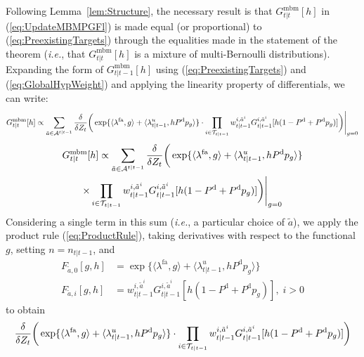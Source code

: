\documentclass[journal,twoside]{IEEEtran}
\theoremstyle{plain}
\begin{document}
\begin{IEEEproof}
Following Lemma~\ref{lem:Structure}, the necessary result is that  $G^\mathrm{mbm}_{t|t}[h]$ in (\ref{eq:UpdateMBMPGFl}) is made equal (or proportional) to (\ref{eq:PreexistingTargets}) through the equalities made in the statement of the theorem (\textit{i.e.}\xspace, that $G^\mathrm{mbm}_{t|t}[h]$ is a mixture of multi-Bernoulli distributions). Expanding the form of $G^\mathrm{mbm}_{t|t-1}[h]$ using (\ref{eq:PreexistingTargets}) and (\ref{eq:GlobalHypWeight}) and applying the linearity property of differentials, we can write:
%
\ifCLASSOPTIONdraftcls
\begin{equation}\label{eq:MBMUpdate1}
G^\mathrm{mbm}_{t|t}[h] \propto
\sum_{\tilde{a}\in{\cal A}^{t|t-1}} \frac{\delta}{\delta Z_t}\bigg( 
\exp\{\langle\lambda^\mathrm{fa},g\rangle + \langle\lambda^u_{t|t-1},h P^{\mathrm{d}} p_g\rangle\} 
\cdot \prod_{i\in{\cal T}_{t|t-1}}w^{i,\tilde{a}^i}_{t|t-1}G^{i,\tilde{a}^i}_{t|t-1}[h(1-P^{\mathrm{d}} + P^{\mathrm{d}} p_g)]\bigg)\Bigg|_{g=0}
\end{equation}
\else
\begin{multline}\label{eq:MBMUpdate1}
G^\mathrm{mbm}_{t|t}[h] \propto
\sum_{\tilde{a}\in{\cal A}^{t|t-1}} \frac{\delta}{\delta Z_t}\bigg( 
\exp\{\langle\lambda^\mathrm{fa},g\rangle + \langle\lambda^u_{t|t-1},h P^{\mathrm{d}} p_g\rangle\} \\
\times \prod_{i\in{\cal T}_{t|t-1}}w^{i,\tilde{a}^i}_{t|t-1}G^{i,\tilde{a}^i}_{t|t-1}[h(1-P^{\mathrm{d}} + P^{\mathrm{d}} p_g)]\bigg)\Bigg|_{g=0}
\end{multline}
\fi
%
Considering a single term in this sum (\textit{i.e.}\xspace, a particular choice of $\tilde{a}$), we apply the product rule (\ref{eq:ProductRule}), taking derivatives with respect to the functional $g$, setting $n=n_{t|t-1}$, and
%
\begin{align}
F_{\tilde{a},0}[g,h] &= \exp\{\langle\lambda^\mathrm{fa},g\rangle + \langle\lambda^u_{t|t-1},h P^{\mathrm{d}} p_g\rangle\} \\
F_{\tilde{a},i}[g,h] &= w^{i,\tilde{a}^i}_{t|t-1}G^{i,\tilde{a}^i}_{t|t-1}[h(1-P^{\mathrm{d}} + P^{\mathrm{d}} p_g)], \; i>0
\end{align}
%
to obtain
%
\ifCLASSOPTIONdraftcls
\begin{multline}
\frac{\delta}{\delta Z_t}\bigg(\exp\{\langle\lambda^\mathrm{fa},g\rangle + \langle\lambda^u_{t|t-1},h P^{\mathrm{d}} p_g\rangle\} 
\cdot \prod_{i\in{\cal T}_{t|t-1}}w^{i,\tilde{a}^i}_{t|t-1}G^{i,\tilde{a}^i}_{t|t-1}[h(1-P^{\mathrm{d}} + P^{\mathrm{d}} p_g)]\bigg) \\

\end{multline}
\end{IEEEproof}
\end{document}
